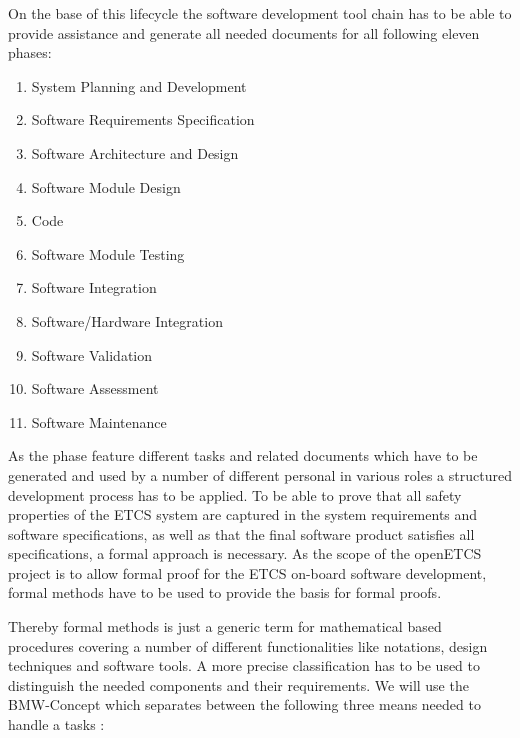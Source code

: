 \documentclass{./template/openetcs2}
\begin{document}
On the base of this lifecycle the software development tool chain has to be able to provide assistance and generate all needed documents for all following eleven phases:

\vspace{-10pt}
\begin{enumerate} [topsep=2pt, partopsep=2pt,itemsep=2pt,parsep=2pt]
  \item System Planning and Development
  \item Software Requirements Specification
  \item Software Architecture and Design
  \item Software Module Design
  \item Code
  \item Software Module Testing
  \item Software Integration
  \item Software/Hardware Integration
  \item Software Validation
  \item Software Assessment
  \item Software Maintenance
\end{enumerate}

As the phase feature different tasks and related documents which have to be generated and used by a number of different personal in various roles a structured development process has to be applied. To be able to prove that all safety properties of the ETCS system are captured in the system requirements and software specifications, as well as that the final software product satisfies all specifications, a formal approach is necessary. As the scope of the openETCS project is to allow formal proof for the ETCS on-board software development, formal methods have to be used to provide the basis for formal proofs. 

Thereby formal methods is just a generic term for mathematical based procedures covering a number of different functionalities like notations, design techniques and software tools.  A more precise classification has to be used to distinguish the needed components and their requirements. We will use the BMW-Concept which separates between the following three means needed to handle a tasks \citep{Schnieder.1999}:
\end{document}
